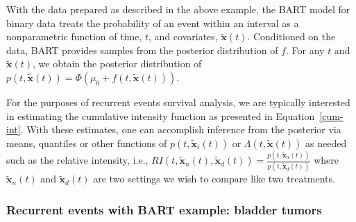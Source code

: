 \documentclass[article]{jss}
\begin{document}

With the data prepared as described in the above example, the BART
model for binary data treats the probability of an event within an
interval as a nonparametric function of time, $t$, and 
covariates, $\tilde{\bm{x}}(t)$. Conditioned on the data, BART
provides samples
from the posterior distribution of $f$. For any $t$ and $\tilde{\bm{x}}(t)$,
we obtain the posterior distribution of
$p(t, \tilde{\bm{x}}(t))  =\Phi(\mu_0+f(t, \tilde{\bm{x}}(t)))$.

For the purposes of recurrent events survival analysis, we are
typically interested in estimating the cumulative intensity function
as presented in Equation~\ref{cum-int}.  With these estimates, one
can accomplish inference from the posterior via means, quantiles or
other functions of $ p(t, \tilde{\bm{x}}_i(t))$ or
$\Lambda(t,\tilde{\bm{x}}(t))$ as needed such as the relative
intensity, i.e.,
$RI(t,\tilde{\bm{x}}_n(t),\tilde{\bm{x}}_d(t))=\frac{p(t,\tilde{\bm{x}}_n(t))}{p(t,\tilde{\bm{x}}_d(t))}$\label{risk}
where $\tilde{\bm{x}}_n(t) $ and $\tilde{\bm{x}}_d(t) $ are two
settings we wish to compare like two
treatments. %

\subsubsection{Recurrent events with BART example: bladder tumors}
\end{document}
